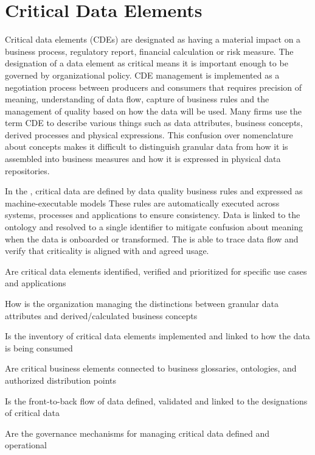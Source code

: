 \section{Critical Data Elements}\label{sec:ekgmm-b-4-5} %

Critical data elements (CDEs) are designated as having a material impact on a business process, regulatory report, financial calculation or risk measure.
The designation of a data element as critical means it is important enough to be governed by organizational policy.
CDE management is implemented as a negotiation process between producers and consumers that requires precision of meaning,
understanding of data flow, capture of business rules and the management of quality based on how the data will be used.
Many firms use the term CDE to describe various things such as data attributes, business concepts, derived processes and physical expressions.
This confusion over nomenclature about concepts makes it difficult to distinguish granular data from how it is assembled into business measures and how it is expressed in physical data repositories.

\kgmmekgrationalesection

In the , critical data are defined by data quality business rules and expressed as machine-executable models
These rules are automatically executed across systems, processes and applications to ensure consistency.
Data is linked to the ontology and resolved to a single identifier to mitigate confusion about meaning when the data is onboarded or transformed.
The  is able to trace data flow and verify that criticality is aligned with  and agreed usage.

\kgmmcorequestionssection

\begin{core-questions}

  \item [\thesection.1] Are critical data elements identified, verified and prioritized for specific use cases and applications
  \item [\thesection.2] How is the organization managing the distinctions between granular data attributes and derived/calculated business concepts
  \item [\thesection.3] Is the inventory of critical data elements implemented and linked to how the data is being consumed
  \item [\thesection.4] Are critical business elements connected to business glossaries, ontologies,  and authorized distribution points
  \item [\thesection.5] Is the front-to-back flow of data defined, validated and linked to the designations of critical data
  \item [\thesection.6] Are the governance mechanisms for managing critical data defined and operational

\end{core-questions}

